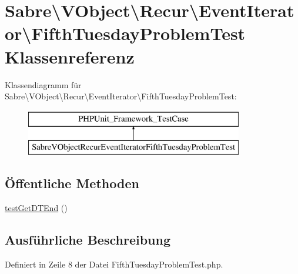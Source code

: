 \hypertarget{class_sabre_1_1_v_object_1_1_recur_1_1_event_iterator_1_1_fifth_tuesday_problem_test}{}\section{Sabre\textbackslash{}V\+Object\textbackslash{}Recur\textbackslash{}Event\+Iterator\textbackslash{}Fifth\+Tuesday\+Problem\+Test Klassenreferenz}
\label{class_sabre_1_1_v_object_1_1_recur_1_1_event_iterator_1_1_fifth_tuesday_problem_test}
Klassendiagramm für Sabre\textbackslash{}V\+Object\textbackslash{}Recur\textbackslash{}Event\+Iterator\textbackslash{}Fifth\+Tuesday\+Problem\+Test\+:\begin{figure}[H]
\begin{center}
\leavevmode
\includegraphics[height=2.000000cm]{class_sabre_1_1_v_object_1_1_recur_1_1_event_iterator_1_1_fifth_tuesday_problem_test}
\end{center}
\end{figure}
\subsection*{Öffentliche Methoden}
\begin{DoxyCompactItemize}
\item 
\mbox{\hyperlink{class_sabre_1_1_v_object_1_1_recur_1_1_event_iterator_1_1_fifth_tuesday_problem_test_afc9f722159d8e88547746d16793c119b}{test\+Get\+D\+T\+End}} ()
\end{DoxyCompactItemize}


\subsection{Ausführliche Beschreibung}


Definiert in Zeile 8 der Datei Fifth\+Tuesday\+Problem\+Test.\+php.




